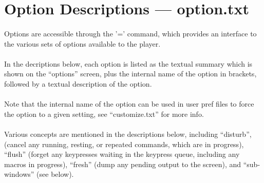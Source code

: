 \section{Option Descriptions --- option.txt}
\paragraph{}Options are accessible through the '=' command, which provides an
interface to the various sets of options available to the player.

\paragraph{}In the decriptions below, each option is listed as the textual summary
which is shown on the ``options'' screen, plus the internal name of the
option in brackets, followed by a textual description of the option.

\paragraph{}Note that the internal name of the option can be used in user pref files
to force the option to a given setting, see ``customize.txt'' for more
info.

\paragraph{}Various concepts are mentioned in the descriptions below, including
``disturb'', (cancel any running, resting, or repeated commands, which are
in progress), ``flush'' (forget any keypresses waiting in the keypress
queue, including any macros in progress), ``fresh'' (dump any pending
output to the screen), and ``sub-windows'' (see below).

